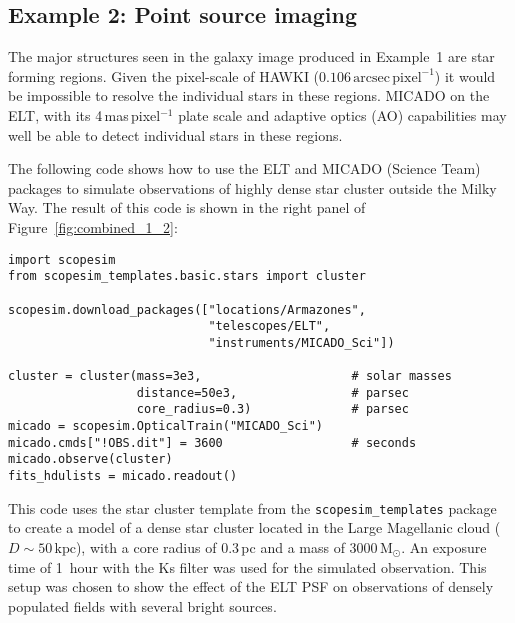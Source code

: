 \subsection{Example 2: Point source imaging}
\label{example-2-point-source-imaging}

The major structures seen in the galaxy image produced in Example~1 are star forming regions.
Given the pixel-scale of HAWKI ($0.106\,\mathrm{arcsec\,pixel^{-1}}$) it would be impossible to resolve the individual stars in these regions.
MICADO\cite{micado2018} on the ELT\cite{elt}, with its 4\,mas\,pixel$^{-1}$ plate scale and adaptive optics (AO) capabilities may well be able to detect individual stars in these regions.

The following code shows how to use the ELT and MICADO (Science Team) packages to simulate observations of highly dense star cluster outside the Milky Way.
The result of this code is shown in the right panel of Figure~\ref{fig:combined_1_2}:

\begin{lstlisting}[frame=single]
import scopesim
from scopesim_templates.basic.stars import cluster

scopesim.download_packages(["locations/Armazones",
                            "telescopes/ELT",
                            "instruments/MICADO_Sci"])

cluster = cluster(mass=3e3,                     # solar masses
                  distance=50e3,                # parsec
                  core_radius=0.3)              # parsec
micado = scopesim.OpticalTrain("MICADO_Sci")
micado.cmds["!OBS.dit"] = 3600                  # seconds
micado.observe(cluster)
fits_hdulists = micado.readout()
\end{lstlisting}

This code uses the star cluster template from the \lstinline{scopesim_templates} package to create a model of a dense star cluster located in the Large Magellanic cloud ($D\sim 50\,\mathrm{kpc}$), with a core radius of 0.3\,pc and a mass of $3000\,\mathrm{M_{\odot}}$.
An exposure time of 1~hour with the Ks filter was used for the simulated observation.
This setup was chosen to show the effect of the ELT PSF on observations of densely populated fields with several bright sources.

